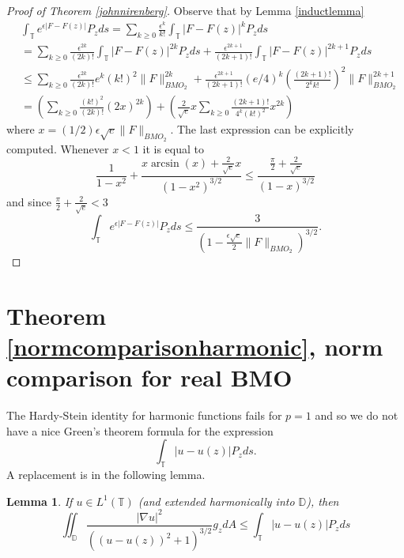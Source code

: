 \documentclass[12pt]{amsart}
\newtheorem{lemma}[theorem]{Lemma}
\theoremstyle{definition}
\theoremstyle{remark}
\numberwithin{equation}{section}
\newcommand{\D}{\mathbb{D}}
\newcommand{\T}{\mathbb{T}}
\begin{document}
\begin{proof}[Proof of Theorem \ref{johnnirenberg}]
Observe that by Lemma \ref{inductlemma}
\[
\begin{aligned}
&\int_{\T} e^{\epsilon |F-F(z)|} P_zds = \sum_{k\geq 0} \frac{\epsilon^k}{k!}
\int_{\T} |F-F(z)|^k P_zds \\ 
&= \sum_{k \geq 0} \frac{\epsilon^{2k}}{(2k)!}
\int_{\T} |F-F(z)|^{2k} P_zds + \frac{\epsilon^{2k+1}}{(2k+1)!} \int_{\T}
|F-F(z)|^{2k+1}P_z ds \\ 
& \leq \sum_{k \geq 0} \frac{\epsilon^{2k}}{(2k)!}
e^k(k!)^2 \|F\|^{2k}_{BMO_2} + \frac{\epsilon^{2k+1}}{(2k+1)!} (e/4)^k
\left(\frac{(2k+1)!}{2^kk!}\right)^2 \|F\|^{2k+1}_{BMO_2}\\
&=\left(\sum_{k\geq 0} \frac{(k!)^2}{(2k)!}(2x)^{2k}\right) +
\left(\frac{2}{\sqrt{e}}x\sum_{k\geq 0} \frac{(2k+1)!}{4^k(k!)^2}
x^{2k}\right)
\end{aligned}
\]
where $x = (1/2)\epsilon\sqrt{e} \|F\|_{BMO_2}$.  The last expression
can be explicitly computed. Whenever $x < 1$ it is equal to
\[
\frac{1}{1-x^2} + \frac{x\arcsin(x) + \frac{2}{\sqrt{e}}
  x}{(1-x^2)^{3/2}} \leq
\frac{\frac{\pi}{2}+\frac{2}{\sqrt{e}}}{(1-x)^{3/2}} 
\]
and since $\frac{\pi}{2}+\frac{2}{\sqrt{e}} < 3$
\[
\int_{\T} e^{\epsilon |F-F(z)|} P_z ds \leq \frac{3}{(1-\frac{\epsilon
    \sqrt{e}}{2} \|F\|_{BMO_2})^{3/2}}.
\]


\end{proof}

\section{Theorem \ref{normcomparisonharmonic}, norm
  comparison for real BMO} \label{sec:harmnormcomp}
The Hardy-Stein identity for harmonic functions fails for $p=1$ and so
we do not have a nice Green's theorem formula for the expression
\[
\int_{\T} |u-u(z)|P_z ds.
\]
A replacement is in the following lemma.

\begin{lemma} \label{h1lemma} If $u \in L^1(\T)$ (and extended
  harmonically into $\D$), then
\[
\iint_{\D} \frac{|\nabla u|^2}{((u-u(z))^2+1)^{3/2}} g_z dA \leq
\int_{\T}|u-u(z)|P_z ds 
\]
\end{lemma}
\end{document}
